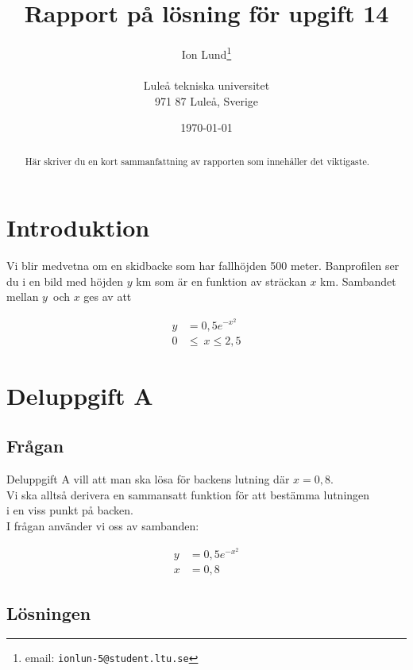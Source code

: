 \documentclass[a4paper,12pt]{article}
\title{Rapport på lösning för upgift 14}
\author{Ion Lund\thanks{email:
        \texttt{ionlun-5@student.ltu.se}}\\  
        ~ \\
        Luleå tekniska universitet \\ 
        971 87 Luleå, Sverige}
\date{\today}
\begin{document}
\linenumbers %

\maketitle

\begin{abstract}

  Här skriver du en kort sammanfattning av rapporten som innehåller
  det viktigaste. 

\end{abstract}

\section{Introduktion}
\label{sec:introduktion}

  Vi blir medvetna om en skidbacke som har fallhöjden 500 meter. Banprofilen ser 
  du i en bild 
  med höjden $y$ km som är en funktion av sträckan $x$ km.
  Sambandet mellan $y$ och $x$ ges av att

  \begin{align}
    \label{eq:1}
    y &= 0,5e^{-x^2} \nonumber \\
    0 &\le~x \le 2,5 \nonumber
  \end{align}

\section{Deluppgift A}

\label{sec:uppg1}

  \subsection{Frågan}

    Deluppgift A vill att man ska lösa för backens lutning där $x = 0,8$.\\
    Vi ska alltså derivera en sammansatt funktion för att bestämma lutningen \\
    i en viss punkt på backen. \\
    I frågan använder vi oss av sambanden:

    \begin{align}
      \label{eq:2}
      y &= 0,5e^{-x^2} \nonumber \\
      x &= 0,8 \nonumber
    \end{align}

  \newpage

  \subsection{Lösningen}
\end{document}
